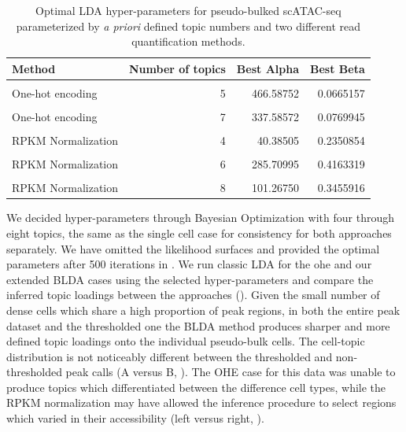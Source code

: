 \begin{table}
  \centering
  \begin{tabular}[t]{lrrr}
  \toprule
  Method & Number of topics & Best Alpha & Best Beta\\
  \midrule
  \cellcolor{gray!6}{One-hot encoding} & \cellcolor{gray!6}{4} & \cellcolor{gray!6}{123.68822} & \cellcolor{gray!6}{0.0382351}\\
  One-hot encoding & 5 & 466.58752 & 0.0665157\\
  \cellcolor{gray!6}{One-hot encoding} & \cellcolor{gray!6}{6} & \cellcolor{gray!6}{450.96735} & \cellcolor{gray!6}{0.0756824}\\
  One-hot encoding & 7 & 337.58572 & 0.0769945\\
  \cellcolor{gray!6}{One-hot encoding} & \cellcolor{gray!6}{8} & \cellcolor{gray!6}{100.35205} & \cellcolor{gray!6}{0.0872716}\\
  \addlinespace
  RPKM Normalization & 4 & 40.38505 & 0.2350854\\
  \cellcolor{gray!6}{RPKM Normalization} & \cellcolor{gray!6}{5} & \cellcolor{gray!6}{285.51986} & \cellcolor{gray!6}{0.3011584}\\
  RPKM Normalization & 6 & 285.70995 & 0.4163319\\
  \cellcolor{gray!6}{RPKM Normalization} & \cellcolor{gray!6}{7} & \cellcolor{gray!6}{366.02309} & \cellcolor{gray!6}{0.3825605}\\
  RPKM Normalization & 8 & 101.26750 & 0.3455916\\
  \bottomrule
  \end{tabular}
  \caption{Optimal LDA hyper-parameters for pseudo-bulked scATAC-seq parameterized by \textit{a priori} defined topic numbers and two different read quantification methods.}
  \label{table:pb_opt_params}
\end{table}

We decided hyper-parameters through Bayesian Optimization with four through eight topics, the same as the single cell case for consistency for both approaches separately. We have omitted the likelihood surfaces and provided the optimal parameters after 500 iterations in . We run classic LDA for the \gls{ohe} and our extended BLDA cases using the selected hyper-parameters and compare the inferred topic loadings between the approaches (). Given the small number of dense cells which share a high proportion of peak regions, in both the entire peak dataset and the thresholded one the BLDA method produces sharper and more defined topic loadings onto the individual pseudo-bulk cells. The cell-topic distribution is not noticeably different between the thresholded and non-thresholded peak calls (A versus B, ).
The OHE case for this data was unable to produce topics which differentiated between the difference cell types, while the RPKM normalization may have allowed the inference procedure to select regions which varied in their accessibility (left versus right, ). 

